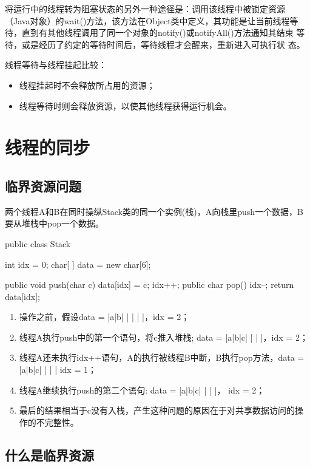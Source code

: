 将运行中的线程转为阻塞状态的另外一种途径是：调用该线程中被锁定资源
（Java对象）的wait()方法，该方法在Object类中定义，其功能是让当前线程等
待，直到有其他线程调用了同一个对象的notify()或notifyAll()方法通知其结束
等待，或是经历了约定的等待时间后，等待线程才会醒来，重新进入可执行状
态。
 
线程等待与线程挂起比较：

\begin{itemize}
\item 线程挂起时不会释放所占用的资源；
\item 线程等待时则会释放资源，以使其他线程获得运行机会。
\end{itemize}

\section{线程的同步}

\subsection{临界资源问题}

两个线程A和B在同时操纵Stack类的同一个实例(栈)，A向栈里push一个数据，B要从堆栈中pop一个数据。


\begin{javaCode}
public class Stack {
  int idx = 0;
  char[ ] data = new char[6];
  
  public void push(char c) {
    data[idx] = c;
    idx++;
  }
  public char pop() {
    idx--;
    return data[idx];
  }
}
\end{javaCode}


\begin{enumerate}
\item 操作之前，假设data = |a|b| | | | |，idx = 2；
\item 线程A执行push中的第一个语句，将c推入堆栈; data = |a|b|c| | | |，idx = 2；
\item 线程A还未执行idx++语句，A的执行被线程B中断，B执行pop方法，data = |a|b|c| | | | idx = 1；
\item 线程A继续执行push的第二个语句: data = |a|b|c| | | |， idx = 2；
\item 最后的结果相当于c没有入栈，产生这种问题的原因在于对共享数据访问的操作的不完整性。
\end{enumerate}


\subsection{什么是临界资源}

